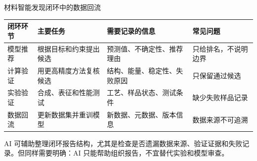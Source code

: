 \begin{formalTable}[htbp]
\caption{材料智能发现闭环中的数据回流}
\label{tab:closed-loop-data-feedback}
\footnotesize
\begin{tabularx}{\textwidth}{@{}YYYY@{}}
\toprule
\textbf{闭环环节} & \textbf{主要任务} & \textbf{需要记录的信息} & \textbf{常见问题} \\
\midrule
模型推荐 & 根据目标和约束提出候选 & 预测值、不确定性、推荐理由 & 只给排名，不说明边界 \\
计算验证 & 用更高精度方法复核候选 & 结构、能量、稳定性、失败原因 & 只保留通过候选 \\
实验验证 & 合成、表征和性能测试 & 工艺、样品状态、测试条件 & 缺少失败样品记录 \\
数据回流 & 更新数据集并重训模型 & 新数据、元数据、版本信息 & 数据来源不可追溯 \\
\bottomrule
\end{tabularx}
\end{formalTable}

AI 可辅助整理闭环报告结构，尤其是检查是否遗漏数据来源、验证证据和失败记录。但同样需要明确：AI 只能帮助组织报告，不宜替代实验和模型审查。

